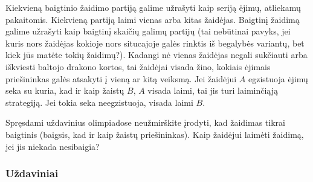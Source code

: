 Kiekvieną baigtinio žaidimo partiją galime užrašyti kaip seriją ėjimų,
atliekamų pakaitomis. Kiekvieną partiją laimi vienas arba kitas žaidėjas.
Baigtinį žaidimą galime užrašyti kaip baigtinį skaičių galimų partijų
(tai nebūtinai pavyks, jei kuris nors žaidėjas kokioje nors situcajoje
galės rinktis iš  begalybės variantų, bet kiek jūs matėte tokių žaidimų?).
Kadangi nė vienas žaidėjas negali  sukčiauti arba iškviesti baltojo drakono
kortos, tai žaidėjai visada žino, kokiais ėjimais priešininkas galės
atsakyti į vieną ar kitą veiksmą. Jei žaidėjui $A$ egzistuoja ėjimų seka su
kuria, kad ir kaip žaistų $B$, $A$ visada laimi, tai jis turi laiminčiąją
strategiją. Jei tokia seka neegzistuoja, visada laimi $B$. 

\begin{pastaba}
Spręsdami uždavinius olimpiadose neužmirškite įrodyti, kad žaidimas tikrai
baigtinis (baigsis, kad ir kaip žaistų priešininkas). Kaip žaidėjui laimėti
žaidimą, jei jis niekada nesibaigia?
\end{pastaba}

\subsubsection{Uždaviniai}

